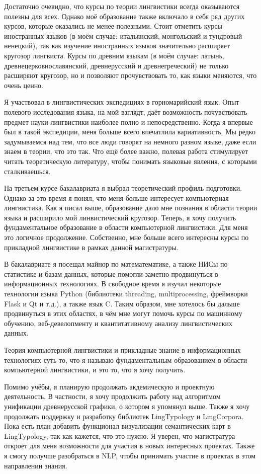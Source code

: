 \documentclass[a4paper,10pt]{article}
\begin{document}
Достаточно очевидно, что курсы по теории лингвистики всегда оказываются полезны для всех. Однако моё образование также включало в себя ряд других курсов, которые оказались не менее полезными. Стоит отметить курсы иностранных языков (в моём случае: итальянский, монгольский и тундровый ненецкий), так как изучение иностранных языков значительно расширяет кругозор лингвиста. Курсы по древним языкам (в моём случае: латынь, древнецерковнославянский, древнерусский и древнегреческий) не только расширяют кругозор, но и позволяют прочувствовать то, как языки меняются, что очень ценно.

Я участвовал в лингвистических экспедициях в горномарийский язык. Опыт полевого исследования языка, на мой взглядт, даёт возможность почувствовать предмет науки лингвистики наиболее полно и непосредственно. Когда я впервые был в такой экспедиции, меня больше всего впечатлила вариативность. Мы редко задумываемся над тем, что все люди говорят на немного разном языке, даже если знаем в теории, что это так. Что ещё более важно, полевая работа стимулирует читать теоретическую литературу, чтобы понимать языковые явления, с которыми сталкиваешься.

На третьем курсе бакалавриата я выбрал теоретический профиль подготовки. Однако за это время я понял, что меня больше интересует компьютерная лингвистика. Как я писал выше, образование дало мне познания в области теории языка и расширило мой линвистический кругозор. Теперь, я хочу получить фундаментальное образование в области компьютерной лингвистики. Для меня это логичное продолжение. Собственно, мне больше всего интересны курсы по прикладной лингвистике в рамках данной магистратуры.

В бакалавриате я посещал майнор по математематике, а также НИСы по статистике и базам данных, которые помогли заметно продвинуться в информационных технологиях. В свободное время я изучал некоторые технологии языка Python (библиотеки threading, multiprocessing, фреймворки Flask и Qt и т.д.), а также язык C. Таким образом, мне хотелось бы дальше продвинуться в этих областях, в чём мне могут помочь курсы по машинному обучению, веб-девелопменту и квантитативному анализу лингвистических данных.

Теория компьютерной лингвистики и прикладные знание в информационных технологиях суть то, что я называю фундаментальным образованием в области компьютерной лингвистики, и это то, что я хочу получить.

Помимо учёбы, я планирую продолжать акдемическую и проектную деятельность. В частности, я хочу продолжить работу над алгоритмом унификации древнерусской графики, о котором я упомянул выше. Также я хочу продолжать поддержку и разработку библиотек LingTypology и LingCorpora. Пока есть план добавить функционал визуализации семантических карт в LingTypology, так как кажется, что это нужно. Я уверен, что магистратура откроет для меня возможности для участия в новых интересных проектах. Также я смогу получше разобраться в NLP, чтобы принимать участие в проектах в этом направлении знания.
\end{document}
